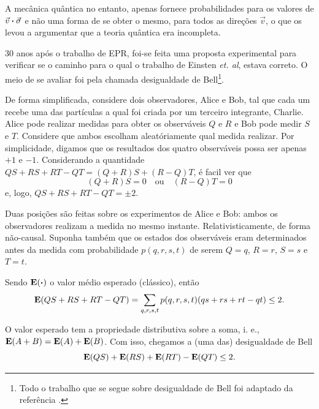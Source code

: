 A mecânica quântica no entanto, apenas fornece probabilidades para os valores de $\vec{v} \vdot \vec{\sigma}$ e não uma forma de se obter o mesmo, para todos as direções $\vec{v}$, o que os levou a argumentar que a teoria quântica era incompleta.

30 anos após o trabalho de EPR, foi-se feita uma proposta experimental para verificar se o caminho para o qual o trabalho de Einsten \textit{et. al}, estava correto. O meio de se avaliar foi pela chamada desigualdade de Bell\footnote{Todo o trabalho que se segue sobre desigualdade de Bell foi adaptado da referência \cite{QuantumCompInf}.}. 

De forma simplificada, considere dois observadores, Alice e Bob, tal que cada um recebe uma das partículas a qual foi criada por um terceiro integrante, Charlie. Alice pode realizar medidas para obter os observáveis $Q$ e $R$ e Bob pode medir $S$ e $T$. Considere que ambos escolham aleatóriamente qual medida realizar. Por simplicidade, digamos que os resultados dos quatro observáveis possa ser apenas $+1$ e $-1$. Considerando a quantidade $QS + RS + RT  - QT = (Q+R)S + (R-Q)T$, é facil ver que
\begin{equation*}
	(Q+R)S = 0 \quad \text{ou} \quad (R-Q)T = 0
\end{equation*}
e, logo, $QS+RS+RT-QT = \pm 2$.

Duas posições são feitas sobre os experimentos de Alice e Bob: ambos os observadores realizam a medida no mesmo instante. Relativisticamente, de forma não-causal. Suponha também que os estados dos observáveis eram determinados antes da medida com probabilidade  $p(q, r, s ,t )$ de serem $Q = q$, $R = r$, $S = s$ e $T = t$. 

Sendo $\vb{E}(\vdot)$ o valor médio esperado (clássico), então
\begin{equation*}
	\vb{E}(QS + RS + RT - QT) = \sum_{q, r, s, t} p(q, r, s, t)(qs + rs + rt - qt) \leq 2.
\end{equation*}

O valor esperado tem a propriedade distributiva sobre a soma, i. e., $\vb{E}(A+B) = \vb{E}(A) + \vb{E}(B)$. Com isso, chegamos a (uma das) desigualdade de Bell
\begin{equation}
	\vb{E}(QS) + \vb{E}(RS) + \vb{E}(RT) - \vb{E}(QT) \leq 2.
	\label{eq:II.11}
\end{equation}

